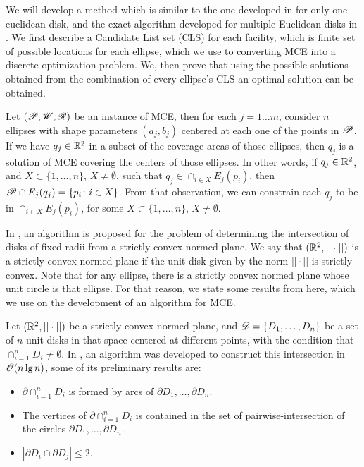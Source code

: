 We will develop a method which is similar to the one developed in \cite{drezner} for only one euclidean disk, and the exact algorithm developed for multiple Euclidean disks in \cite{cabello:2006}. 
We first describe a Candidate List set (CLS) for each facility, which is finite set of possible locations for each ellipse, which we use to converting MCE into a discrete optimization problem. We, then prove that using the possible solutions obtained from the combination of every ellipse's CLS an optimal solution can be obtained.


Let $(\mathscr{P}, \mathscr{W}, \mathscr{R})$ be an instance of MCE, then for each $j=1\dots m$, consider $n$ ellipses with shape parameters $(a_j, b_j)$ centered at each one of the points in $\mathscr{P}$. If we have $q_j\in\mathbb{R}^2$ in a subset of the coverage areas of those ellipses, then $q_j$ is a solution of MCE covering the centers of those ellipses. In other words, if $q_j \in \mathbb{R}^2$, and $X \subset \{1, \dots, n\}$, $X \neq \emptyset$, such that $q_j \in \cap_{i\in X}E_j(p_i)$, then $\mathscr{P} \cap E_j(q_j) = \{p_i \colon i \in X\}$.
From that observation, we can constrain each $q_j$ to be in $\cap_{i\in X} E_j(p_i)$, for some $X \subset \{1, \dots,n\}$, $X \neq \emptyset$.

In \cite{bi}, an algorithm is proposed for the problem of determining the intersection of disks of fixed radii from a strictly convex normed plane. 
We say that $(\mathbb{R}^2, ||\cdot||)$ is a strictly convex normed plane if the unit disk given by the norm $||\cdot||$ is strictly convex. Note that for any ellipse, there is a strictly convex normed plane whose unit circle is that ellipse.
For that reason, we state some results from \cite{bi} here, which we use on the development of an algorithm for MCE.


Let $(\mathbb{R}^2, ||\cdot||)$ be a strictly convex normed plane, and $\mathscr{D}=\{D_1, \dots, D_n\}$ be a set of $n$ unit disks in that space centered at different points, with the condition that  $\cap_{i=1}^n D_i \neq \emptyset$. In \cite{bi}, an algorithm was developed to construct this intersection in $\mathscr{O}(n\lg{n})$, some of its preliminary results are:
\begin{itemize}
	\item $\partial \cap_{i=1}^n D_i$ is formed by arcs of $\partial D_1, \dots, \partial D_n$.
	\item The vertices of $\partial \cap_{i=1}^n D_i$ is contained in the set of pairwise-intersection of the circles $\partial D_1, \dots, \partial D_n$.
	\item $|\partial D_i \cap \partial D_j| \le 2$.
\end{itemize}

